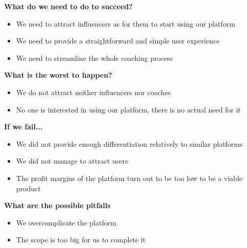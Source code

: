 \textbf{What do we need to do to succeed?}

\begin{itemize}
  \item We need to attract influencers as for them to start using our platform
  \item We need to provide a straightforward and simple user experience
  \item We need to streamline the whole coaching process
\end{itemize}

\textbf{What is the worst to happen?}

\begin{itemize}
  \item We do not attract neither influencers nor coaches
  \item No one is interested in using our platform, there is no actual need for it
\end{itemize}

\textbf{If we fail...}

\begin{itemize}
  \item We did not provide enough differentiation relatively to similar platforms
  \item We did not manage to attract users
  \item  The profit margins of the platform turn out to be too low to be a viable product
\end{itemize}

\textbf{What are the possible pitfalls}

\begin{itemize}
  \item We overcomplicate the platform
  \item The scope is too big for us to complete it
\end{itemize}

